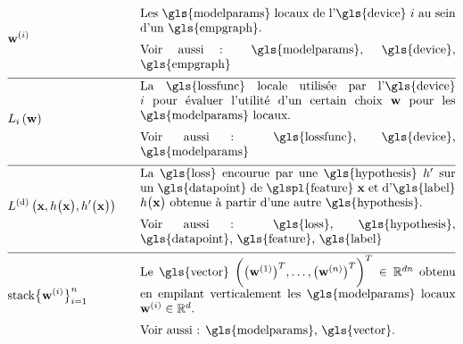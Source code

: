 \begin{align}
	&\localparams{\nodeidx} & \quad & \parbox{.75\textwidth}{
		Les \gls{modelparams} locaux de l'\gls{device} $\nodeidx$ au sein d’un \gls{empgraph}. \\
		[2mm] Voir aussi : \gls{modelparams}, \gls{device}, \gls{empgraph}
	} \nonumber \\[2mm] \hline \nonumber\\[-5mm]
	&\locallossfunc{\nodeidx}{\weights} & \quad & \parbox{.75\textwidth}{
		La \gls{lossfunc} locale utilisée par l'\gls{device} $\nodeidx$ pour évaluer l’utilité d’un certain choix $\weights$ pour les \gls{modelparams} locaux. \\
		[2mm] Voir aussi : \gls{lossfunc}, \gls{device}, \gls{modelparams}
	} \nonumber \\[2mm] \hline \nonumber\\[-5mm]
	&\gtvloss{\featurevec}{\hypothesis\big(\featurevec\big)}{\hypothesis'\big(\featurevec\big)} & \quad & \parbox{.75\textwidth}{
		La \gls{loss} encourue par une \gls{hypothesis} $\hypothesis'$ sur un \gls{datapoint} de \glspl{feature} $\featurevec$ et d'\gls{label} $\hypothesis\big( \featurevec\big)$ obtenue à partir d’une autre \gls{hypothesis}. \\
		[2mm] Voir aussi : \gls{loss}, \gls{hypothesis}, \gls{datapoint}, \gls{feature}, \gls{label}
	} \nonumber \\[2mm] \hline \nonumber\\[-5mm]
	&{\rm stack} \big\{ \weights^{(\nodeidx)} \big\}_{\nodeidx=1}^{\nrnodes} & \quad & \parbox{.75\textwidth}{
		Le \gls{vector} $\bigg( \big(\weights^{(1)}  \big)^{T}, \ldots, \big(\weights^{(\nrnodes)}  \big)^{T} \bigg)^{T} \in \mathbb{R}^{\dimlocalmodel\nrnodes}$ obtenu en empilant verticalement les \gls{modelparams} locaux $\weights^{(\nodeidx)} \in \mathbb{R}^{\dimlocalmodel}$. \\
		[2mm] Voir aussi : \gls{modelparams}, \gls{vector}.
	} \nonumber
\end{align}


